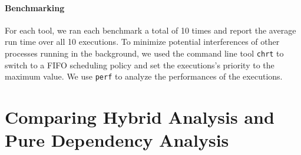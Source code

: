 \paragraph{Benchmarking}
For each tool, we ran each benchmark a total of 10 times and report the average run time over all 10 executions. To minimize potential interferences of other processes running in the background, we used the command line tool \texttt{chrt} to switch to a FIFO scheduling policy and set the executions's priority to the maximum value.
We use \texttt{perf} to analyze the performances of the executions.

\section{Comparing Hybrid Analysis and Pure Dependency Analysis}